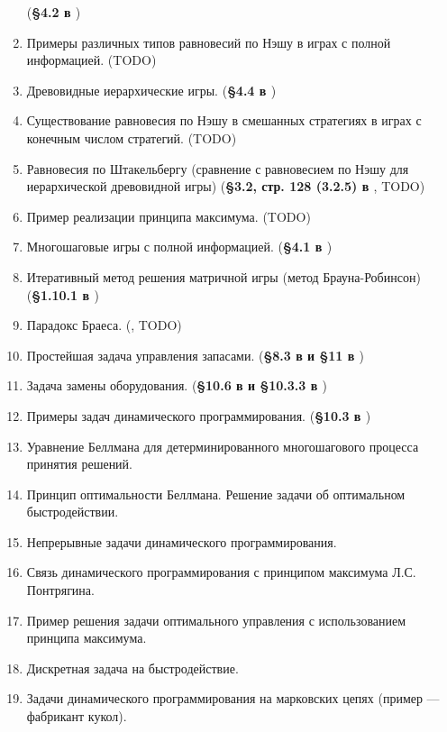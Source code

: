 \documentclass[a4paper,14pt]{extarticle}
\begin{document}
\begin{enumerate}
        (\textbf{\S 4.2 в \cite{gametheory-2012}})
    \item Примеры различных типов равновесий по Нэшу в играх с полной информацией.
        (TODO)
    \item Древовидные иерархические игры.
        (\textbf{\S 4.4 в \cite{gametheory-2012}})
    \item Существование равновесия по Нэшу в смешанных стратегиях в играх с конечным числом стратегий.
        (TODO)
    \item Равновесия по Штакельбергу (сравнение с равновесием по Нэшу для иерархической древовидной игры)
        (\textbf{\S 3.2, стр. 128 (3.2.5) в \cite{gametheory-2012}}, TODO)
    \item Пример реализации принципа максимума.
        (TODO)
    \item Многошаговые игры с полной информацией.
        (\textbf{\S 4.1 в \cite{gametheory-2012}})
    \item Итеративный метод решения матричной игры (метод Брауна-Робинсон)
        (\textbf{\S 1.10.1 в \cite{gametheory-2012}})
    \item Парадокс Браеса.
        (\textbf{\cite{wiki-braess-ru}}, TODO) %
    \item Простейшая задача управления запасами.
        (\textbf{\S 8.3 в \cite{vagner-2-1983} и \S 11 в \cite{taha-2002}})
    \item Задача замены оборудования.
        (\textbf{\S 10.6 в \cite{vagner-2-1983} и \S 10.3.3 в \cite{taha-2002}})
    \item Примеры задач динамического программирования.
        (\textbf{\S 10.3 в \cite{taha-2002}})
    \item Уравнение Беллмана для детерминированного многошагового процесса принятия решений.
    \item Принцип оптимальности Беллмана. Решение задачи об оптимальном быстродействии.
    \item Непрерывные задачи динамического программирования.
    \item Связь динамического программирования с принципом максимума Л.С. Понтрягина.
    \item Пример решения задачи оптимального управления с использованием принципа максимума.
    \item Дискретная задача на быстродействие.
    \item Задачи динамического программирования на марковских цепях (пример --- фабрикант кукол).
\end{enumerate}

\custombibliography
\end{document}
